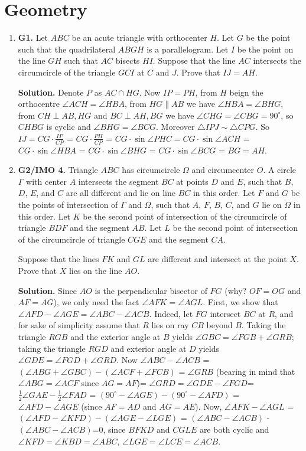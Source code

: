 \documentclass[11pt,a4paper]{article}
\begin{document}
\section{Geometry}
\begin{enumerate}
\item\textbf{G1.} Let $ABC$ be an acute triangle with orthocenter $H$. Let $G$ be the point such that the quadrilateral $ABGH$ is a parallelogram. Let $I$ be the point on the line $GH$ such that $AC$ bisects $HI$. Suppose that the line $AC$ intersects the circumcircle of the triangle $GCI$ at $C$ and $J$. Prove that $IJ = AH$.

\textbf{Solution.} Denote $P$ as $AC\cap HG$. Now $IP=PH$, from $H$ beign the orthocentre $\angle ACH=\angle HBA$, from $HG\parallel AB$ we have $\angle HBA=\angle BHG$, from $CH\perp AB, HG$ and $BC\perp AH, BG$ we have $\angle CHG=\angle CBG=90^{\circ}$, so $CHBG$ is cyclic and $\angle BHG=\angle BCG$. Moreover $\triangle IPJ\sim\triangle CPG$. So $IJ=CG\cdot\frac{IP}{CP}$ = $CG\cdot\frac{PH}{CP}$ = $CG\cdot\sin\angle PHC=CG\cdot\sin\angle ACH$ = $CG\cdot\sin\angle HBA$ = $CG\cdot\sin\angle BHG$ = $CG\cdot\sin\angle BCG$ = $BG=AH$.

\item\textbf{G2/IMO 4.} Triangle $ABC$ has circumcircle $\Omega$ and circumcenter $O$. A circle $\Gamma$ with center $A$ intersects the segment $BC$ at points $D$ and $E$, such that $B$, $D$, $E$, and $C$ are all different and lie on line $BC$ in this order. Let $F$ and $G$ be the points of intersection of $\Gamma$ and $\Omega$, such that $A$, $F$, $B$, $C$, and $G$ lie on $\Omega$ in this order. Let $K$ be the second point of intersection of the circumcircle of triangle $BDF$ and the segment $AB$. Let $L$ be the second point of intersection of the circumcircle of triangle $CGE$ and the segment $CA$.

Suppose that the lines $FK$ and $GL$ are different and intersect at the point $X$. Prove that $X$ lies on the line $AO$.

\textbf{Solution.} Since $AO$ is the perpendicular bisector of $FG$ (why? $OF=OG$ and $AF=AG$), we only need the fact $\angle AFK=\angle AGL$. First, we show that $\angle AFD-\angle AGE=\angle ABC-\angle ACB$. Indeed, let $FG$ intersect $BC$ at $R$, and for sake of simplicity assume that $R$ lies on ray $CB$ beyond $B$. Taking the triangle $RGB$ and the exterior angle at $B$ yields $\angle GBC=\angle FGB+\angle GRB$; taking the triangle $RGD$ and exterior angle at $D$ yields $\angle GDE=\angle FGD+\angle GRD$. Now $\angle ABC-\angle ACB$ = $(\angle ABG+\angle GBC)-(\angle ACF+\angle FCB)$ = $\angle GRB$ (bearing in mind that $\angle ABG=\angle ACF$ since $AG=AF$)= $\angle GRD=\angle GDE-\angle FGD$= $\frac{1}{2}\angle GAE-\frac 12\angle FAD$ = $(90^{\circ}-\angle AGE)-(90^{\circ}-\angle AFD)$ = $\angle AFD-\angle AGE$ (since $AF=AD$ and $AG=AE$). Now, $\angle AFK-\angle AGL$ = $(\angle AFD-\angle KFD)-(\angle AGE-\angle LGE)$ = $(\angle ABC-\angle ACB)$ - $(\angle ABC-\angle ACB)$=0, since $BFKD$ and $CGLE$ are both cyclic and $\angle KFD=\angle KBD=\angle ABC$, $\angle LGE=\angle LCE=\angle ACB$.


\end{enumerate}
\end{document}
